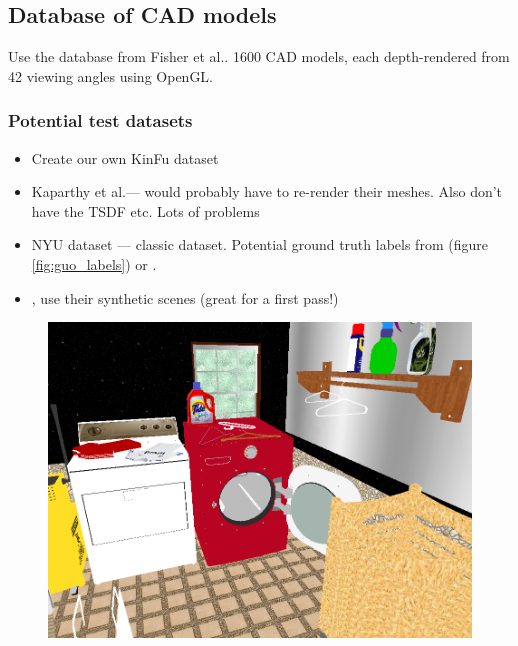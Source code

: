 \documentclass[10pt,a4paper, twocolumn]{article}
\makeatletter
\newcommand*{\ea}{et al.\@\xspace}
\makeatother
\begin{document}
\subsection{Database of CAD models}
Use the database from Fisher \ea \cite{fisher-siggraphasia-2012}.
1600 CAD models, each depth-rendered from 42 viewing angles using OpenGL.

\subsubsection{Potential test datasets}
\begin{itemize}
\item Create our own KinFu dataset
\item Kaparthy \ea --- would probably have to re-render their meshes.
Also don't have the TSDF etc. Lots of problems
\item NYU dataset --- classic dataset. Potential ground truth labels from \cite{guo-iccv-2013} (figure \ref{fig:guo_labels}) or \cite{kim-iccv-2013}.
\item \cite{fisher-siggraphasia-2012}, use their synthetic scenes (great for a first pass!)
\end{itemize}


\begin{figure}
	\centering%
	\includegraphics[width=1.0\columnwidth]{synth_scene.png}%
	\label{fig:fisher_scene}%
\end{figure}


%



\end{document}
